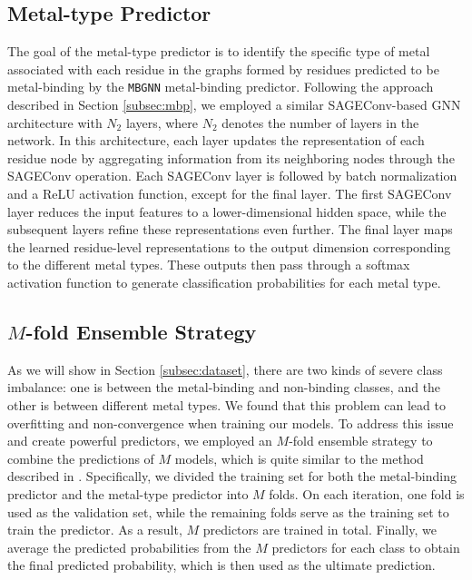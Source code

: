 \documentclass[letterpaper, 10 pt, conference]{ieeeconf}
\begin{document}
\subsection{Metal-type Predictor}

The goal of the metal-type predictor is to identify the specific type of metal associated with each residue in the graphs formed by residues predicted to be metal-binding by the \texttt{MBGNN} metal-binding predictor. Following the approach described in Section \ref{subsec:mbp}, we employed a similar SAGEConv-based GNN architecture with $N_2$ layers, where $N_2$ denotes the number of layers in the network. In this architecture, each layer updates the representation of each residue node by aggregating information from its neighboring nodes through the SAGEConv operation. Each SAGEConv layer is followed by batch normalization and a ReLU activation function, except for the final layer. The first SAGEConv layer reduces the input features to a lower-dimensional hidden space, while the subsequent layers refine these representations even further. The final layer maps the learned residue-level representations to the output dimension corresponding to the different metal types. These outputs then pass through a softmax activation function to generate classification probabilities for each metal type.

\subsection{$M$-fold Ensemble Strategy}
\label{subsec:mfold}
As we will show in Section \ref{subsec:dataset}, there are two kinds of severe class imbalance: one is between the metal-binding and non-binding classes, and the other is between different metal types. We found that this problem can lead to overfitting and non-convergence when training our models. To address this issue and create powerful predictors, we employed an $M$-fold ensemble strategy to combine the predictions of $M$ models, which is quite similar to the method described in \cite{XIA2023168091}. Specifically, we divided the training set for both the metal-binding predictor and the metal-type predictor into $M$ folds. On each iteration, one fold is used as the validation set, while the remaining folds serve as the training set to train the predictor. As a result, $M$ predictors are trained in total. Finally, we average the predicted probabilities from the $M$ predictors for each class to obtain the final predicted probability, which is then used as the ultimate prediction.
\end{document}
